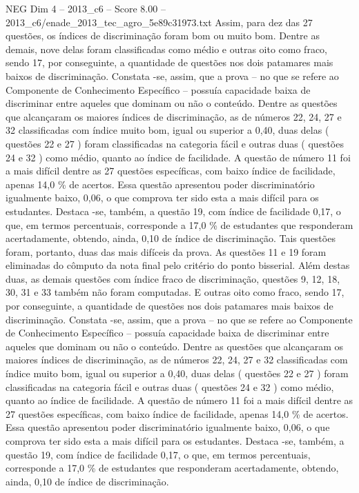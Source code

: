 \begin{textsample}{NEG Dim 4 – 2013\_c6 – Score 8.00 – 2013\_c6/enade\_2013\_tec\_agro\_5e89c31973.txt}
Assim, para dez das 27 questões, os índices de discriminação foram bom ou muito bom.
Dentre as demais, nove delas foram classificadas como médio e outras oito como fraco, sendo 17, por conseguinte, a quantidade de questões nos dois patamares mais baixos de discriminação.
Constata -se, assim, que a prova – no que se refere ao Componente de Conhecimento Específico – possuía capacidade baixa de discriminar entre aqueles que dominam ou não o conteúdo.
Dentre as questões que alcançaram os maiores índices de discriminação, as de números 22, 24, 27 e 32 classificadas com índice muito bom, igual ou superior a 0,40, duas delas ( questões 22 e 27 ) foram classificadas na categoria fácil e outras duas ( questões 24 e 32 ) como médio, quanto ao índice de facilidade.
A questão de número 11 foi a mais difícil dentre as 27 questões específicas, com baixo índice de facilidade, apenas 14,0 \% de acertos.
Essa questão apresentou poder discriminatório igualmente baixo, 0,06, o que comprova ter sido esta a mais difícil para os estudantes.
Destaca -se, também, a questão 19, com índice de facilidade 0,17, o que, em termos percentuais, corresponde a 17,0 \% de estudantes que responderam acertadamente, obtendo, ainda, 0,10 de índice de discriminação.
Tais questões foram, portanto, duas das mais difíceis da prova.
As questões 11 e 19 foram eliminadas do cômputo da nota final pelo critério do ponto bisserial.
Além destas duas, as demais questões com índice fraco de discriminação, questões 9, 12, 18, 30, 31 e 33 também não foram computadas.
E outras oito como fraco, sendo 17, por conseguinte, a quantidade de questões nos dois patamares mais baixos de discriminação.
Constata -se, assim, que a prova – no que se refere ao Componente de Conhecimento Específico – possuía capacidade baixa de discriminar entre aqueles que dominam ou não o conteúdo.
Dentre as questões que alcançaram os maiores índices de discriminação, as de números 22, 24, 27 e 32 classificadas com índice muito bom, igual ou superior a 0,40, duas delas ( questões 22 e 27 ) foram classificadas na categoria fácil e outras duas ( questões 24 e 32 ) como médio, quanto ao índice de facilidade.
A questão de número 11 foi a mais difícil dentre as 27 questões específicas, com baixo índice de facilidade, apenas 14,0 \% de acertos.
Essa questão apresentou poder discriminatório igualmente baixo, 0,06, o que comprova ter sido esta a mais difícil para os estudantes.
Destaca -se, também, a questão 19, com índice de facilidade 0,17, o que, em termos percentuais, corresponde a 17,0 \% de estudantes que responderam acertadamente, obtendo, ainda, 0,10 de índice de discriminação.

\end{textsample}
